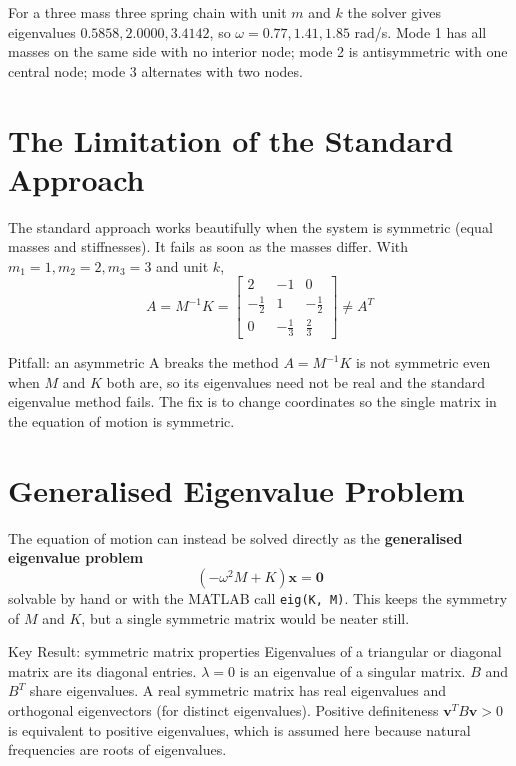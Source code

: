 \documentclass[10pt,a4paper]{article}
\begin{document}
For a three mass three spring chain with unit $m$ and $k$ the solver gives eigenvalues $0.5858, 2.0000, 3.4142$, so $\omega = 0.77, 1.41, 1.85$ rad/s. Mode 1 has all masses on the same side with no interior node; mode 2 is antisymmetric with one central node; mode 3 alternates with two nodes.


\section{The Limitation of the Standard Approach}
The standard approach works beautifully when the system is symmetric (equal masses and stiffnesses). It fails as soon as the masses differ. With $m_1 = 1, m_2 = 2, m_3 = 3$ and unit $k$,
\begin{equation}
  A = M^{-1}K = \begin{bmatrix} 2 & -1 & 0 \\ -\tfrac{1}{2} & 1 & -\tfrac{1}{2} \\ 0 & -\tfrac{1}{3} & \tfrac{2}{3} \end{bmatrix} \neq A^{T}
\end{equation}

\begin{warningbox}{Pitfall: an asymmetric A breaks the method}
$A = M^{-1}K$ is not symmetric even when $M$ and $K$ both are, so its eigenvalues need not be real and the standard eigenvalue method fails. The fix is to change coordinates so the single matrix in the equation of motion is symmetric.
\end{warningbox}

\section{Generalised Eigenvalue Problem}
The equation of motion can instead be solved directly as the \textbf{generalised eigenvalue problem}
\begin{equation}
  (-\omega^2 M + K)\mathbf{x} = \mathbf{0}
\end{equation}
solvable by hand or with the MATLAB call \texttt{eig(K, M)}. This keeps the symmetry of $M$ and $K$, but a single symmetric matrix would be neater still.

\begin{keybox}{Key Result: symmetric matrix properties}
Eigenvalues of a triangular or diagonal matrix are its diagonal entries. $\lambda = 0$ is an eigenvalue of a singular matrix. $B$ and $B^{T}$ share eigenvalues. A real symmetric matrix has real eigenvalues and orthogonal eigenvectors (for distinct eigenvalues). Positive definiteness $\mathbf{v}^{T}B\mathbf{v} > 0$ is equivalent to positive eigenvalues, which is assumed here because natural frequencies are roots of eigenvalues.
\end{keybox}
\end{document}
